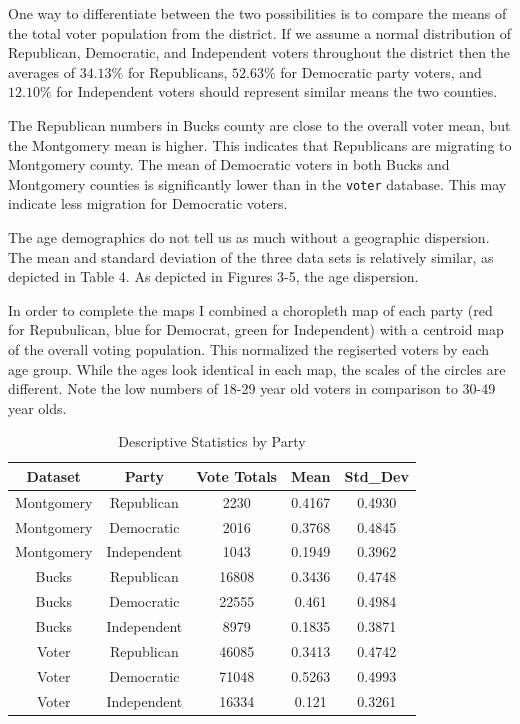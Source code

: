 \documentclass[]{article}
\begin{document}
One way to differentiate between the two possibilities is to compare the
means of the total voter population from the district. If we assume a
normal distribution of Republican, Democratic, and Independent voters
throughout the district then the averages of \(34.13\%\) for
Republicans, \(52.63\%\) for Democratic party voters, and \(12.10\%\)
for Independent voters should represent similar means the two counties.

The Republican numbers in Bucks county are close to the overall voter
mean, but the Montgomery mean is higher. This indicates that Republicans
are migrating to Montgomery county. The mean of Democratic voters in
both Bucks and Montgomery counties is significantly lower than in the
\texttt{voter} database. This may indicate less migration for Democratic
voters.

The age demographics do not tell us as much without a geographic
dispersion. The mean and standard deviation of the three data sets is
relatively similar, as depicted in Table 4. As depicted in Figures 3-5,
the age dispersion.

In order to complete the maps I combined a choropleth map of each party
(red for Repubulican, blue for Democrat, green for Independent) with a
centroid map of the overall voting population. This normalized the
regiserted voters by each age group. While the ages look identical in
each map, the scales of the circles are different. Note the low numbers
of 18-29 year old voters in comparison to 30-49 year olds.

\begin{table}[]
\centering
\caption{Descriptive Statistics by Party}
\label{my-label}
\begin{tabular}{ccccc}
Dataset    & Party       & Vote Totals & Mean   & Std\_Dev \\ \hline
Montgomery & Republican  & 2230         & 0.4167 & 0.4930    \\
Montgomery & Democratic  & 2016         & 0.3768 & 0.4845   \\
Montgomery & Independent & 1043         & 0.1949 & 0.3962   \\ \hline
Bucks      & Republican  & 16808        & 0.3436 & 0.4748   \\
Bucks      & Democratic  & 22555        & 0.461  & 0.4984   \\
Bucks      & Independent & 8979         & 0.1835 & 0.3871   \\ \hline
Voter      & Republican  & 46085        & 0.3413 & 0.4742   \\
Voter      & Democratic  & 71048        & 0.5263 & 0.4993   \\
Voter      & Independent & 16334        & 0.121  & 0.3261  \\ \hline \hline
\end{tabular}
\end{table}
\end{document}
